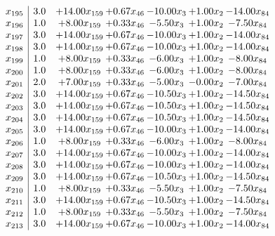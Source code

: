 \documentclass[8pt]{article}
\begin{document}
\[\begin{array}{c| c c@{\hskip 2pt} c@{\hskip 2pt} c@{\hskip 2pt} c@{\hskip 2pt} c@{\hskip 2pt} }
 x_{195}   &  3.0 & + 14.00 x_{159} & +  0.67 x_{46} & -10.00 x_{3} & +  1.00 x_{2} & -14.00 x_{84}\\
 x_{196}   &  1.0 & +  8.00 x_{159} & +  0.33 x_{46} & -5.50 x_{3} & +  1.00 x_{2} & -7.50 x_{84}\\
 x_{197}   &  3.0 & + 14.00 x_{159} & +  0.67 x_{46} & -10.00 x_{3} & +  1.00 x_{2} & -14.00 x_{84}\\
 x_{198}   &  3.0 & + 14.00 x_{159} & +  0.67 x_{46} & -10.00 x_{3} & +  1.00 x_{2} & -14.00 x_{84}\\
 x_{199}   &  1.0 & +  8.00 x_{159} & +  0.33 x_{46} & -6.00 x_{3} & +  1.00 x_{2} & -8.00 x_{84}\\
 x_{200}   &  1.0 & +  8.00 x_{159} & +  0.33 x_{46} & -6.00 x_{3} & +  1.00 x_{2} & -8.00 x_{84}\\
 x_{201}   &  2.0 & +  7.00 x_{159} & +  0.33 x_{46} & -5.00 x_{3} & -0.00 x_{2} & -7.00 x_{84}\\
 x_{202}   &  3.0 & + 14.00 x_{159} & +  0.67 x_{46} & -10.50 x_{3} & +  1.00 x_{2} & -14.50 x_{84}\\
 x_{203}   &  3.0 & + 14.00 x_{159} & +  0.67 x_{46} & -10.50 x_{3} & +  1.00 x_{2} & -14.50 x_{84}\\
 x_{204}   &  3.0 & + 14.00 x_{159} & +  0.67 x_{46} & -10.50 x_{3} & +  1.00 x_{2} & -14.50 x_{84}\\
 x_{205}   &  3.0 & + 14.00 x_{159} & +  0.67 x_{46} & -10.00 x_{3} & +  1.00 x_{2} & -14.00 x_{84}\\
 x_{206}   &  1.0 & +  8.00 x_{159} & +  0.33 x_{46} & -6.00 x_{3} & +  1.00 x_{2} & -8.00 x_{84}\\
 x_{207}   &  3.0 & + 14.00 x_{159} & +  0.67 x_{46} & -10.00 x_{3} & +  1.00 x_{2} & -14.00 x_{84}\\
 x_{208}   &  3.0 & + 14.00 x_{159} & +  0.67 x_{46} & -10.00 x_{3} & +  1.00 x_{2} & -14.00 x_{84}\\
 x_{209}   &  3.0 & + 14.00 x_{159} & +  0.67 x_{46} & -10.50 x_{3} & +  1.00 x_{2} & -14.50 x_{84}\\
 x_{210}   &  1.0 & +  8.00 x_{159} & +  0.33 x_{46} & -5.50 x_{3} & +  1.00 x_{2} & -7.50 x_{84}\\
 x_{211}   &  3.0 & + 14.00 x_{159} & +  0.67 x_{46} & -10.50 x_{3} & +  1.00 x_{2} & -14.50 x_{84}\\
 x_{212}   &  1.0 & +  8.00 x_{159} & +  0.33 x_{46} & -5.50 x_{3} & +  1.00 x_{2} & -7.50 x_{84}\\
 x_{213}   &  3.0 & + 14.00 x_{159} & +  0.67 x_{46} & -10.00 x_{3} & +  1.00 x_{2} & -14.00 x_{84}\\

\end{array}\]
\end{document}
